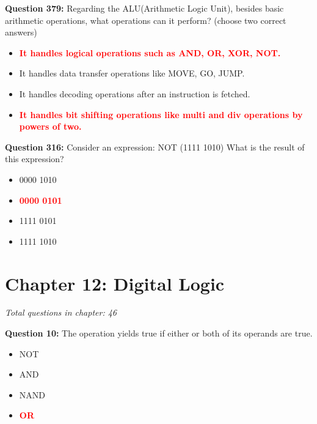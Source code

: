 \documentclass[12pt,a4paper]{article}
\begin{document}
\vspace{0.5cm}

\vspace{0.5cm}

\textbf{Question 379:} Regarding the ALU(Arithmetic Logic Unit), besides basic arithmetic operations, what operations can it perform? (choose two correct answers)

\begin{itemize}
    \item[\textbf{A.}] \textcolor{red}{\textbf{It handles logical operations such as AND, OR, XOR, NOT.}}
    \item[\textbf{B.}] It handles data transfer operations like MOVE, GO, JUMP.
    \item[\textbf{C.}] It handles decoding operations after an instruction is fetched.
    \item[\textbf{D.}] \textcolor{red}{\textbf{It handles bit shifting operations like multi and div operations by powers of two.}}
\end{itemize}

\vspace{0.5cm}

\vspace{0.5cm}

\textbf{Question 316:} Consider an expression: NOT (1111 1010) What is the result of this expression?

\begin{itemize}
    \item[\textbf{A.}] 0000 1010
    \item[\textbf{B.}] \textcolor{red}{\textbf{0000 0101}}
    \item[\textbf{C.}] 1111 0101
    \item[\textbf{D.}] 1111 1010
\end{itemize}

\vspace{0.5cm}

\vspace{0.5cm}

\section{Chapter 12: Digital Logic}
\textit{Total questions in chapter: 46}

\textbf{Question 10:} The operation \underline{\hspace{1.5cm}} yields true if either or both of its operands are true.

\begin{itemize}
    \item[\textbf{A.}] NOT
    \item[\textbf{B.}] AND
    \item[\textbf{C.}] NAND
    \item[\textbf{D.}] \textcolor{red}{\textbf{OR}}
\end{itemize}
\end{document}

